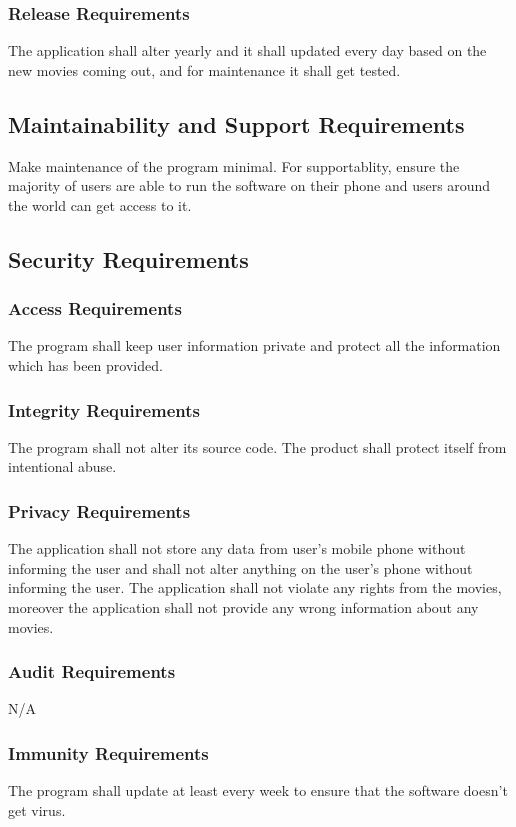 \documentclass[12pt, titlepage]{article}
\begin{document}
\subsubsection{Release Requirements}
The application shall alter yearly and it shall updated every day based on the new movies coming out, and for maintenance it shall get tested.


\subsection{Maintainability and Support Requirements}

Make maintenance of the program minimal. For supportablity, ensure the majority of users are able to run the software on their phone and users around the world can get access to it.

\subsection{Security Requirements}
\subsubsection{Access Requirements}
The program shall keep user information private and protect all the information which has been provided.

\subsubsection{Integrity Requirements}
The program shall not alter its source code.
The product shall protect itself from intentional abuse.

\subsubsection{Privacy Requirements}
The application shall not store any data from user’s mobile phone without informing the user and shall not alter anything on the user’s phone without informing the user. The application shall not violate any rights from the movies, moreover the application shall not provide any wrong information about any movies.

\subsubsection{Audit Requirements}
N/A

\subsubsection{Immunity Requirements}
The program shall update at least every week to ensure that the software doesn’t get virus.
\end{document}
